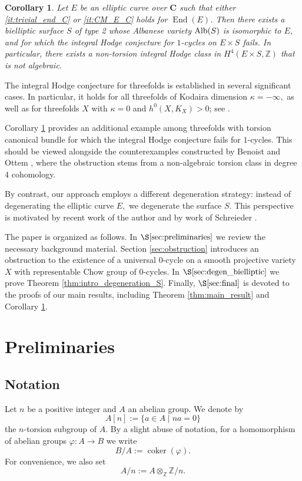 \documentclass[11pt,letterpaper]{amsart}
\newcommand{\Alb}{\textnormal{Alb}}
\numberwithin{equation}{section}
\newtheorem{corollary}[theorem]{Corollary}
\theoremstyle{definition}
\theoremstyle{remark}
\newcommand{\Z}{\mathbb{Z}}
\newcommand{\bbC}{\mathbf{C}}
\DeclareMathOperator{\End}{End}
\DeclareMathOperator{\coker}{coker}
\begin{document}
\begin{corollary}\label{cor:integral_Hodge_S} Let $E$ be an elliptic curve over $\bbC$ such that either \ref{it:trivial_end_C} or \ref{it:CM_E_C} holds for $\End(E)$. Then there exists a bielliptic surface $S$ of type 2 whose Albanese variety $\Alb(S)$ is isomorphic to $E,$ and for which the integral Hodge conjecture for $1$-cycles on $E\times S$ fails. In particular, there exists a non-torsion integral Hodge class in $H^{4}(E\times S,\Z)$ that is not algebraic.
\end{corollary}
The integral Hodge conjecture for threefolds is established in several significant cases. In particular, it holds for all threefolds of Kodaira dimension $\kappa=-\infty,$ as well as for threefolds $X$ with $\kappa=0$ and $h^0(X,K_{X})>0$; see \cite{Voisin2006,Totaro2021,Grabowski2004}.\par 
Corollary \ref{cor:integral_Hodge_S} provides an additional example among threefolds with torsion canonical bundle for which the integral Hodge conjecture fails for $1$-cycles. This should be viewed alongside the counterexamples constructed by Benoist and Ottem \cite{benoist-ottem}, where the obstruction stems from a non-algebraic torsion class in degree $4$ cohomology.\par
By contrast, our approach employs a different degeneration strategy: instead of degenerating the elliptic curve $E,$ we degenerate the surface $S.$ This perspective is motivated by recent work of the author \cite{Alexandrou, alexandrou2025torsionhigherchowcycles} and by work of Schreieder \cite{Schreieder2025}.
\par
The paper is organized as follows. In $\S \ref{sec:preliminaries}$ we review the necessary background material. Section \ref{sec:obstruction} introduces an obstruction to the existence of a universal $0$-cycle on a smooth projective variety $X$ with representable Chow group of $0$-cycles. In $\S \ref{sec:degen_bielliptic}$ we prove Theorem \ref{thm:intro_degeneration_S}. Finally, $\S \ref{sec:final}$ is devoted to the proofs of our main results, including Theorem \ref{thm:main_result} and Corollary \ref{cor:integral_Hodge_S}.

\section{Preliminaries}\label{sec:preliminaries}

\subsection{Notation}\label{subsec:notation} Let $n$ be a positive integer and $A$ an abelian group. We denote by
$$
A[n] := \{a \in A \mid na = 0\}
$$
the $n$-torsion subgroup of $A$. By a slight abuse of notation, for a homomorphism of abelian groups
$\varphi \colon A \to B$ we write
$$
B/A := \coker(\varphi).
$$
For convenience, we also set
$$
A/n := A \otimes_{\mathbb{Z}} \mathbb{Z}/n.
$$
\end{document}
